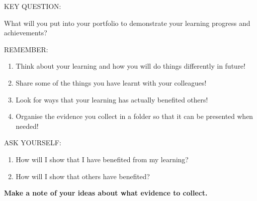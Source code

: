 KEY QUESTION:

What will you put into your portfolio to demonstrate your learning
progress and achievements?

REMEMBER:

\begin{enumerate}
\item
  Think about your learning and how you will do things differently in
  future!
\item
  Share some of the things you have learnt with your colleagues!
\item
  Look for ways that your learning has actually benefited others!
\item
  Organise the evidence you collect in a folder so that it can be
  presented when needed!
\end{enumerate}
ASK YOURSELF:

\begin{enumerate}
\item
  How will I show that I have benefited from my learning?
\item
  How will I show that others have benefited?
\end{enumerate}
\textbf{Make a note of your ideas about what evidence to collect.}

